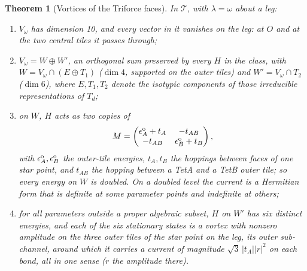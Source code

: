 \documentclass[twocolumn]{iopjournal}
\newtheorem{theorem}{Theorem}
\theoremstyle{definition}
\theoremstyle{remark}
\begin{document}
\begin{theorem}[Vortices of the Triforce faces]
\label{thm:triforce}
In $\mathcal T$, with $\lambda = \omega$ about a leg:
\begin{enumerate}
\item[(i)] $V_\omega$ has dimension 10, and every vector in it vanishes
  on the leg: at $O$ and at the two central tiles it passes through;
\item[(ii)] $V_\omega = W\oplus W'$, an orthogonal sum preserved by every
  $H$ in the class, with $W = V_\omega \cap (E \oplus T_1)$ ($\dim 4$,
  supported on the outer tiles) and $W' = V_\omega \cap T_2$ ($\dim 6$),
  where $E, T_1, T_2$ denote the isotypic components of those irreducible representations of $T_d$;
\item[(iii)] on $W$, $H$ acts as two copies of
  \begin{equation}
  M = \begin{pmatrix}\epsilon^{\rm o}_A + t_A & -t_{AB}\\ -t_{AB} &
  \epsilon^{\rm o}_B + t_B\end{pmatrix},
  \label{eq:M}
  \end{equation}
  with $\epsilon^{\rm o}_A, \epsilon^{\rm o}_B$ the outer-tile energies, $t_A,
  t_B$ the hoppings between faces of one star point, and $t_{AB}$ the
  hopping between a TetA and a TetB outer tile; so every energy on $W$
  is doubled. On a doubled level the current is a Hermitian form that
  is definite at some parameter points and indefinite at others;
\item[(iv)] for all parameters outside a proper algebraic subset, $H$ on
  $W'$ has six distinct energies, and each of the six stationary
  states is a vortex with nonzero amplitude on the three outer tiles of
  the star point on the leg, its outer sub-channel, around which it
  carries a current of
  magnitude $\sqrt3\,\lvert t_A\rvert\lvert r\rvert^2$ on each bond, all
  in one sense ($r$ the amplitude there).
\end{enumerate}
\end{theorem}
\end{document}

